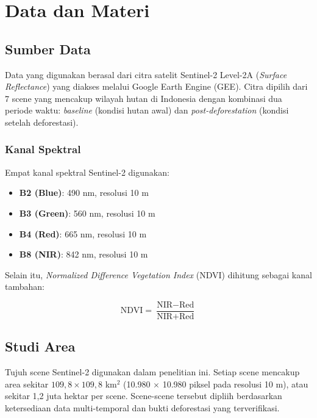 \documentclass[12pt,a4paper]{article}
\begin{document}
\section{Data dan Materi}
\label{sec:data}

\subsection{Sumber Data}

Data yang digunakan berasal dari citra satelit Sentinel-2 Level-2A 
(\textit{Surface Reflectance}) yang diakses melalui Google Earth Engine (GEE). 
Citra dipilih dari 7 scene yang mencakup wilayah hutan di Indonesia dengan 
kombinasi dua periode waktu: \textit{baseline} (kondisi hutan awal) dan 
\textit{post-deforestation} (kondisi setelah deforestasi).

\subsubsection{Kanal Spektral}

Empat kanal spektral Sentinel-2 digunakan:

\begin{itemize}[nosep]
    \item \textbf{B2 (Blue)}: 490 nm, resolusi 10 m
    \item \textbf{B3 (Green)}: 560 nm, resolusi 10 m
    \item \textbf{B4 (Red)}: 665 nm, resolusi 10 m
    \item \textbf{B8 (NIR)}: 842 nm, resolusi 10 m
\end{itemize}

Selain itu, \textit{Normalized Difference Vegetation Index} (NDVI) dihitung 
sebagai kanal tambahan:

\begin{equation}
    \label{eq:ndvi}
    \text{NDVI} = \frac{\text{NIR} - \text{Red}}{\text{NIR} + \text{Red}}
\end{equation}

\subsection{Studi Area}

Tujuh scene Sentinel-2 digunakan dalam penelitian ini. Setiap scene mencakup 
area sekitar $109,8 \times 109,8$ km$^2$ (10.980 $\times$ 10.980 piksel pada 
resolusi 10 m), atau sekitar 1,2 juta hektar per scene. Scene-scene tersebut 
dipliih berdasarkan ketersediaan data multi-temporal dan bukti deforestasi yang 
terverifikasi.
\end{document}
